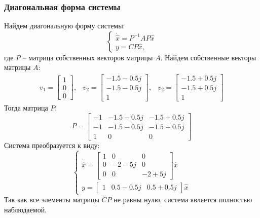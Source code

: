 \subsubsection{Диагональная форма системы}
Найдем диагональную форму системы:
\begin{equation}
    \begin{cases}
        \dot{\hat{x}} = P^{-1}AP\hat{x}\\
        y = CP\hat{x},
    \end{cases}
\end{equation}
где $P$ -- матрица собственных векторов матрицы $A$. Найдем собственные векторы матрицы $A$:
\begin{equation}
    \begin{array}{ccc}
        v_1 = \begin{bmatrix}
            1 \\
            0 \\
            0
        \end{bmatrix}, &
        v_2 = \begin{bmatrix}
            -1.5-0.5j \\
            -1.5-0.5j \\
            1
        \end{bmatrix}, &
        v_2 = \begin{bmatrix}
            -1.5+0.5j \\
            -1.5+0.5j \\
            1
        \end{bmatrix}
    \end{array}
\end{equation}
Тогда матрица $P$:
\begin{equation}
    P = \begin{bmatrix}
        -1 & -1.5-0.5j & -1.5+0.5j \\
        -1 & -1.5-0.5j & -1.5+0.5j \\
        1 & 0 & 0
    \end{bmatrix}
\end{equation}
Система преобразуется к виду: 
\begin{equation}
    \begin{cases}
        \dot{\hat{x}} = \begin{bmatrix}
            1 & 0 & 0 \\
            0 & -2-5j & 0 \\
            0 & 0 & -2+5j
        \end{bmatrix} \hat{x} \\ 
        y = \begin{bmatrix}
            1 & 0.5-0.5j & 0.5+0.5j
        \end{bmatrix} \hat{x}
    \end{cases}
\end{equation}
Так как все элементы матрицы $CP$ не равны нулю, система является полностью наблюдаемой. 

